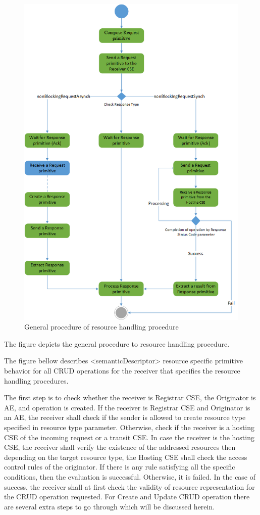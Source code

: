 \begin{figure}[htbp]
    \centering
    \includegraphics[width=1\textwidth]{resources/images/resource}
    \caption{General procedure of resource handling procedure }\label{fig:contrib1:re}
\end{figure}
 The figure depicts the general procedure to resource handling procedure.\par
The figure bellow describes <semanticDescriptor> resource specific primitive behavior for all CRUD operations for the receiver that specifies the resource handling procedures. \par
The first step is to check whether the receiver is Registrar CSE, the Originator is AE, and operation is created. If the receiver is Registrar CSE and Originator is an AE, the receiver shall check if the sender is allowed to create resource type specified in resource type parameter. Otherwise, check if the receiver is a hosting CSE of the incoming request or a transit CSE. In case the receiver is the hosting CSE, the receiver shall verify the existence of the addressed resources then depending on the target resource type, the Hosting CSE shall check the access control rules of the originator. If there is any rule satisfying all the specific conditions, then the evaluation is successful. Otherwise, it is failed. In the case of success, the receiver shall at first check the validity of resource representation for the CRUD operation requested. For Create and Update CRUD operation there are several extra steps to go through which will be discussed herein.\par
